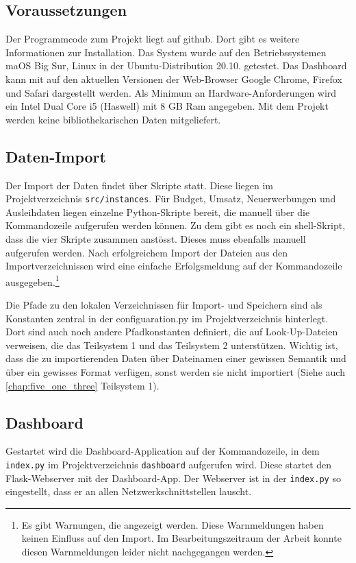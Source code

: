    \subsection{Voraussetzungen}
    Der Programmcode zum Projekt liegt auf github. Dort gibt es weitere Informationen zur Installation.
    Das System wurde auf den Betriebssystemen maOS Big Sur, Linux in der Ubuntu-Distribution 20.10. getestet.
    Das Dashboard kann mit auf den aktuellen Versionen der Web-Browser Google Chrome, Firefox und Safari dargestellt werden. 
    Als Minimum an Hardware-Anforderungen wird ein Intel Dual Core i5 (Haswell) mit 8 GB Ram angegeben.
    Mit dem Projekt werden keine bibliothekarischen Daten mitgeliefert.
    \subsection{Daten-Import}
    Der Import der Daten findet über Skripte statt. Diese liegen im Projektverzeichnis \texttt{src/instances}.
    Für Budget, Umsatz, Neuerwerbungen und Ausleihdaten liegen einzelne Python-Skripte bereit, die manuell über die Kommandozeile
    aufgerufen werden können. Zu dem gibt es noch ein shell-Skript, dass die vier Skripte zusammen anstösst. Dieses
    muss ebenfalls manuell aufgerufen werden.
    Nach erfolgreichem Import der Dateien aus den Importverzeichnissen wird eine einfache Erfolgsmeldung auf der Kommandozeile ausgegeben.\footnote{Es gibt Warnungen,
    die angezeigt werden. Diese Warnmeldungen haben keinen Einfluss auf den Import. Im Bearbeitungszeitraum der Arbeit konnte diesen Warnmeldungen leider nicht nachgegangen werden.}

    Die Pfade zu den lokalen Verzeichnissen für Import- und Speichern sind als Konstanten zentral in der configuaration.py 
    im Projektverzeichnis hinterlegt. Dort sind auch noch andere Pfadkonstanten definiert, die auf Look-Up-Dateien verweisen, die das Teilsystem 1
    und das Teilsystem 2 unterstützen. Wichtig ist, dass die zu importierenden Daten über Dateinamen einer gewissen Semantik und 
    über ein gewisses Format verfügen, sonst werden sie nicht importiert (Siehe auch \autoref{chap:five_one_three} Teilsystem 1).

    \subsection{Dashboard}
    Gestartet wird die Dashboard-Application auf der Kommandozeile, in dem \texttt{index.py} im Projektverzeichnis \texttt{dashboard}
    aufgerufen wird. Diese startet den Flask-Webserver mit der Dashboard-App. Der Webserver ist in der \texttt{index.py} so eingestellt, 
    dass er an allen Netzwerkschnittstellen lauscht.


